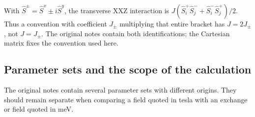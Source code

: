 With \(\hat S^\pm=\hat S^x\pm i\hat S^y\), the transverse XXZ
interaction is \(J(\hat S_i^+\hat S_j^-+\hat S_i^-\hat S_j^+)/2\). Thus
a convention with coefficient \(J_\pm\) multiplying that entire bracket
has \(J=2J_\pm\), not \(J=J_\pm\). The original notes contain both
identifications; the Cartesian matrix fixes the convention used here.

\newpage
\subsection{Parameter sets and the scope of the
calculation}\label{parameter-sets-and-the-scope-of-the-calculation}

The original notes contain several parameter sets with different
origins. They should remain separate when comparing a field quoted in
tesla with an exchange or field quoted in meV.

